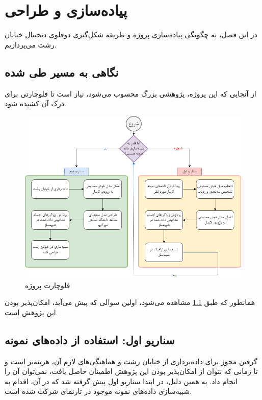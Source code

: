 \chapter{پیاده‌سازی و طراحی}
در این فصل، به چگونگی پیاده‌سازی پروژه و طریقه شکل‌گیری دوقلوی دیجیتال خیابان رشت می‌پردازیم.

\section{نگاهی به مسیر طی شده}
از آنجایی که این پروژه، پژوهشی بزرگ محسوب می‌شود، نیاز است تا فلوچارتی برای درک آن کشیده شود.

\begin{figure}[h!]
    \centering
    \includegraphics[width=1\linewidth]{figures/Project_Flowchart.png}
    \caption{فلوچارت پروژه}
    \label{fig:Project_Flowchart}
\end{figure}

همانطور که طبق \cref{fig:Project_Flowchart} مشاهده می‌شود، اولین سوالی که پیش‌ می‌آید، امکان‌پذیر بودن این پژوهش است.

\section{سناریو اول: استفاده از داده‌های نمونه}
گرفتن مجوز برای داده‌برداری از خیابان رشت و هماهنگی‌های لازم آن، هزینه‌بر است و تا زمانی که نتوان از امکان‌پذیر بودن این پژوهش اطمینان حاصل یافت، نمی‌توان آن را انجام داد. به همین دلیل، در ابتدا سناریو اول پیش گرفته شد که در آن، اقدام به شبیه‌سازی داده‌های نمونه موجود در تارنمای شرکت  شده است.

